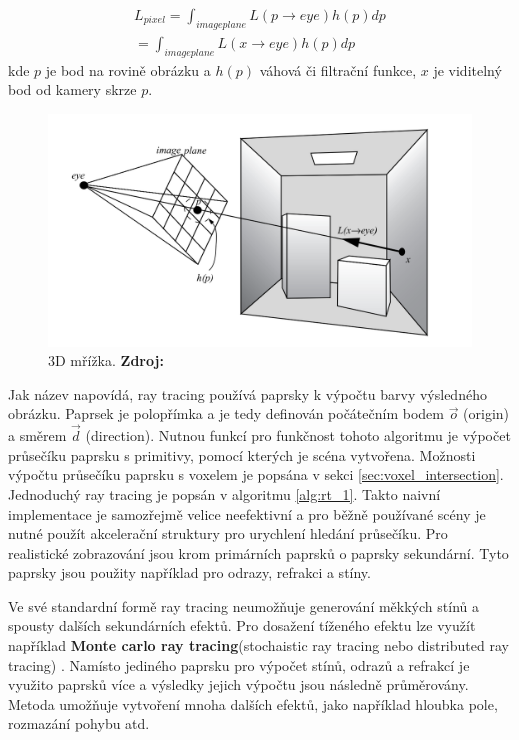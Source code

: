 \begin{equation} \label{eq:rt_1}
\begin{gathered}
L_{pixel} = \int_{imageplane}L(p \xrightarrow{} eye)h(p)dp \\= \int_{imageplane}L(x \xrightarrow{} eye)h(p)dp
\end{gathered}
\end{equation}
kde $p$ je bod na rovině obrázku a $h(p)$ váhová či filtrační funkce, $x$ je viditelný bod od kamery skrze $p$. 

\begin{figure}[H]
    \centering
    \includegraphics[scale=1]{obrazky-figures/ray_tracing_plane.png}
    \caption{3D mřížka. \textbf{Zdroj: \cite{advanced_global}}}
    \label{fig:3d_grid}
\end{figure}


Jak název napovídá, ray tracing používá paprsky k výpočtu barvy výsledného obrázku. Paprsek je polopřímka a je tedy definován počátečním bodem $\Vec{o}$ (origin) a směrem $\Vec{d}$ (direction). Nutnou funkcí pro funkčnost tohoto algoritmu je výpočet průsečíku paprsku s primitivy, pomocí kterých je scéna vytvořena. Možnosti výpočtu průsečíku paprsku s voxelem je popsána v sekci \ref{sec:voxel_intersection}. Jednoduchý ray tracing je popsán v algoritmu \ref{alg:rt_1}. Takto naivní implementace je samozřejmě velice neefektivní a pro běžně používané scény je nutné použít akcelerační struktury pro urychlení hledání průsečíku\cite{accelerated_rt}. Pro realistické zobrazování jsou krom primárních paprsků o paprsky sekundární. Tyto paprsky jsou použity například pro odrazy, refrakci a stíny. 

Ve své standardní formě ray tracing neumožňuje generování měkkých stínů a spousty dalších sekundárních efektů.  Pro dosažení tíženého efektu lze využít například \textbf{Monte carlo ray tracing}(stochaistic ray tracing nebo distributed ray tracing) \cite{distributed_rt}. Namísto jediného paprsku pro výpočet stínů, odrazů a refrakcí je využito paprsků více a výsledky jejich výpočtu jsou následně průměrovány. Metoda umožňuje vytvoření mnoha dalších efektů, jako například hloubka pole, rozmazání pohybu atd. 

